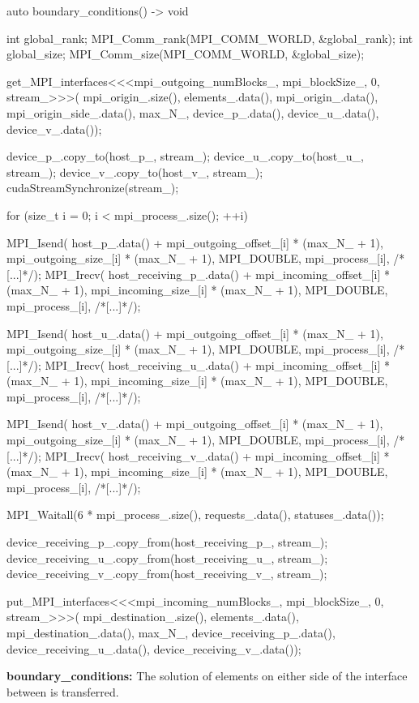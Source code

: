 \begin{algorithm}[H]
    \begin{cuda}
        auto boundary_conditions() -> void {
        	int global_rank;
        	MPI_Comm_rank(MPI_COMM_WORLD, &global_rank);
        	int global_size;
        	MPI_Comm_size(MPI_COMM_WORLD, &global_size);

        	get_MPI_interfaces<<<mpi_outgoing_numBlocks_, mpi_blockSize_, 0, stream_>>>(
        		mpi_origin_.size(), elements_.data(), 
        		mpi_origin_.data(), mpi_origin_side_.data(), max_N_, 
                device_p_.data(), device_u_.data(), device_v_.data());

        	device_p_.copy_to(host_p_, stream_);
        	device_u_.copy_to(host_u_, stream_);
        	device_v_.copy_to(host_v_, stream_);
        	cudaStreamSynchronize(stream_);
			
        	for (size_t i = 0; i < mpi_process_.size(); ++i) {
        		MPI_Isend(
                    host_p_.data() + mpi_outgoing_offset_[i] * (max_N_ + 1), 
                    mpi_outgoing_size_[i] * (max_N_ + 1), 
                    MPI_DOUBLE, mpi_process_[i], /*[...]*/);
        		MPI_Irecv(
                    host_receiving_p_.data() + mpi_incoming_offset_[i] * (max_N_ + 1), 
                    mpi_incoming_size_[i] * (max_N_ + 1), 
                    MPI_DOUBLE, mpi_process_[i], /*[...]*/);

        		MPI_Isend(
                    host_u_.data() + mpi_outgoing_offset_[i] * (max_N_ + 1), 
                    mpi_outgoing_size_[i] * (max_N_ + 1), 
                    MPI_DOUBLE, mpi_process_[i], /*[...]*/);
        		MPI_Irecv(
                    host_receiving_u_.data() + mpi_incoming_offset_[i] * (max_N_ + 1), 
                    mpi_incoming_size_[i] * (max_N_ + 1), 
                    MPI_DOUBLE, mpi_process_[i], /*[...]*/);

        		MPI_Isend(
                    host_v_.data() + mpi_outgoing_offset_[i] * (max_N_ + 1), 
                    mpi_outgoing_size_[i] * (max_N_ + 1), 
                    MPI_DOUBLE, mpi_process_[i], /*[...]*/);
        		MPI_Irecv(
                    host_receiving_v_.data() + mpi_incoming_offset_[i] * (max_N_ + 1), 
                    mpi_incoming_size_[i] * (max_N_ + 1), 
                    MPI_DOUBLE, mpi_process_[i], /*[...]*/);
        	}

        	MPI_Waitall(6 * mpi_process_.size(), requests_.data(), statuses_.data());

        	device_receiving_p_.copy_from(host_receiving_p_, stream_);
        	device_receiving_u_.copy_from(host_receiving_u_, stream_);
        	device_receiving_v_.copy_from(host_receiving_v_, stream_);

        	put_MPI_interfaces<<<mpi_incoming_numBlocks_, mpi_blockSize_, 0, stream_>>>(
        		mpi_destination_.size(), elements_.data(), 
        		mpi_destination_.data(), max_N_, 
        		device_receiving_p_.data(), device_receiving_u_.data(), device_receiving_v_.data());
        }\end{cuda}
\caption{\textbf{boundary\_conditions:} The solution of elements on either side of the interface between  is transferred.}\label{alg:boundary_conditions}
\end{algorithm}